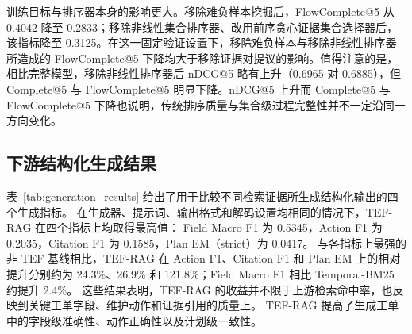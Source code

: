 训练目标与排序器本身的影响更大。移除难负样本挖掘后，FlowComplete@5 从 0.4042 降至 0.2833；移除非线性集合排序器、改用前序贪心证据集合选择器后，该指标降至 0.3125。在这一固定验证设置下，移除难负样本与移除非线性排序器所造成的 FlowComplete@5 下降均大于移除证据对提议的影响。值得注意的是，相比完整模型，移除非线性排序器后 nDCG@5 略有上升（0.6965 对 0.6885），但 Complete@5 与 FlowComplete@5 明显下降。nDCG@5 上升而 Complete@5 与 FlowComplete@5 下降也说明，传统排序质量与集合级过程完整性并不一定沿同一方向变化。

\begin{table}[t]
\caption{TEF-RAG 在验证集上的消融结果。}
\label{tab:ablation_results}
\centering
\small
\setlength{\tabcolsep}{3pt}
\end{table}

\subsection{下游结构化生成结果}
\label{sec:generation_results}

表~\ref{tab:generation_results} 给出了用于比较不同检索证据所生成结构化输出的四个生成指标。
在生成器、提示词、输出格式和解码设置均相同的情况下，TEF-RAG 在四个指标上均取得最高值：
Field Macro F1 为 0.5345，Action F1 为 0.2035，Citation F1 为 0.1585，Plan EM（strict）为 0.0417。
与各指标上最强的非 TEF 基线相比，TEF-RAG 在 Action F1、Citation F1 和 Plan EM 上的相对提升分别约为 24.3\%、26.9\% 和 121.8\%；Field Macro F1 相比 Temporal-BM25 约提升 2.4\%。
这些结果表明，TEF-RAG 的收益并不限于上游检索命中率，也反映到关键工单字段、维护动作和证据引用的质量上。
TEF-RAG 提高了生成工单中的字段级准确性、动作正确性以及计划级一致性。


